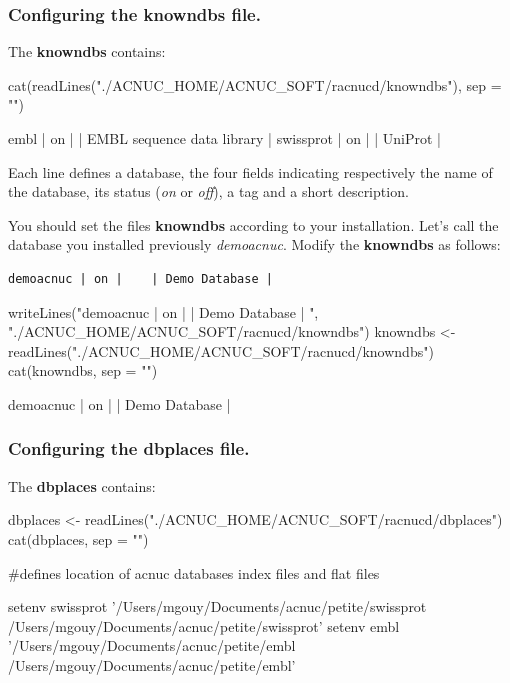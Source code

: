 \documentclass{article}
\begin{document}
 
\subsubsection{Configuring the knowndbs file.}

The \textbf{knowndbs} contains:

\begin{Schunk}
\begin{Sinput}
 cat(readLines("./ACNUC_HOME/ACNUC_SOFT/racnucd/knowndbs"), 
     sep = "\n")
\end{Sinput}
\begin{Soutput}
embl | on |    | EMBL sequence data library | 
swissprot   | on |  | UniProt |
\end{Soutput}
\end{Schunk}

Each line defines a database,  the four fields indicating respectively the name
 of the database, its status  (\textit{on} or \textit{off}), a tag and a short description.
 
You should set the files \textbf{knowndbs}  according to your installation.
Let's call the database you installed previously \textit{demoacnuc}.
Modify  the \textbf{knowndbs} as follows:
\begin{verbatim}
demoacnuc | on |    | Demo Database | 
\end{verbatim}

\begin{Schunk}
\begin{Sinput}
 writeLines("demoacnuc | on |    | Demo Database | ", "./ACNUC_HOME/ACNUC_SOFT/racnucd/knowndbs")
 knowndbs <- readLines("./ACNUC_HOME/ACNUC_SOFT/racnucd/knowndbs")
 cat(knowndbs, sep = "\n")
\end{Sinput}
\begin{Soutput}
demoacnuc | on |    | Demo Database | 
\end{Soutput}
\end{Schunk}

\subsubsection{Configuring the dbplaces file.}


The \textbf{dbplaces} contains:

\begin{Schunk}
\begin{Sinput}
 dbplaces <- readLines("./ACNUC_HOME/ACNUC_SOFT/racnucd/dbplaces")
 cat(dbplaces, sep = "\n")
\end{Sinput}
\begin{Soutput}
#defines location of acnuc databases index files and flat files

setenv 	swissprot 	'/Users/mgouy/Documents/acnuc/petite/swissprot /Users/mgouy/Documents/acnuc/petite/swissprot'
setenv 	embl 	'/Users/mgouy/Documents/acnuc/petite/embl /Users/mgouy/Documents/acnuc/petite/embl'
\end{Soutput}
\end{Schunk}
\end{document}
